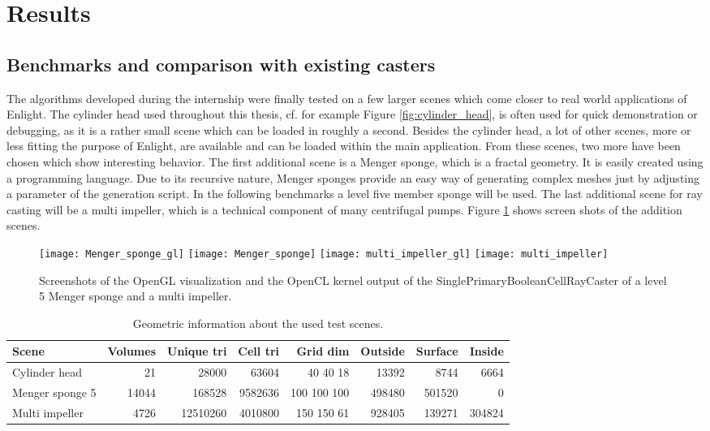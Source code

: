 \section{Results}
\label{sec:results}


\subsection{Benchmarks and comparison with existing casters}

The algorithms developed during the internship were finally tested on a few larger scenes which come closer to real world applications of Enlight. The cylinder head used throughout this thesis, cf. for example Figure \ref{fig:cylinder_head}, is often used for quick demonstration or debugging, as it is a rather small scene which can be loaded in roughly a second. Besides the cylinder head, a lot of other scenes, more or less fitting the purpose of Enlight, are available and can be loaded within the main application. From these scenes, two more have been chosen which show interesting behavior. The first additional scene is a Menger sponge, which is a fractal geometry. It is easily created using a programming language. Due to its recursive nature, Menger sponges provide an easy way of generating complex meshes just by adjusting a parameter of the generation script. In the following benchmarks a level five member sponge will be used. The last additional scene for ray casting will be a multi impeller, which is a technical component of many centrifugal pumps. Figure \ref{fig:Menger_sponge_multi_impeller} shows screen shots of the addition scenes.

\begin{figure}
\centering
\texttt{[image: Menger\_sponge\_gl]}
\texttt{[image: Menger\_sponge]}
\texttt{[image: multi\_impeller\_gl]}
\texttt{[image: multi\_impeller]}
\caption{Screenshots of the OpenGL visualization and the OpenCL kernel output of the SinglePrimaryBooleanCellRayCaster of a level 5 Menger sponge and a multi impeller.}
\label{fig:Menger_sponge_multi_impeller}
\end{figure}

\begin{table}[h]
\centering
\begin{tabular}{|l | r r r r r r r|}
\hline
Scene & Volumes & Unique tri & Cell tri & Grid dim & Outside & Surface & Inside \\
\hline
Cylinder head & 21 & 28000 & 63604 & 40 40 18 & 13392 & 8744 & 6664 \\
Menger sponge 5 & 14044 & 168528 & 9582636 & 100 100 100 & 498480 & 501520 & 0 \\
Multi impeller & 4726 & 12510260 & 4010800 & 150 150 61 & 928405 & 139271 & 304824 \\
\hline
\end{tabular}
\caption{Geometric information about the used test scenes.}
\label{tbl:geometrics}
\end{table}

